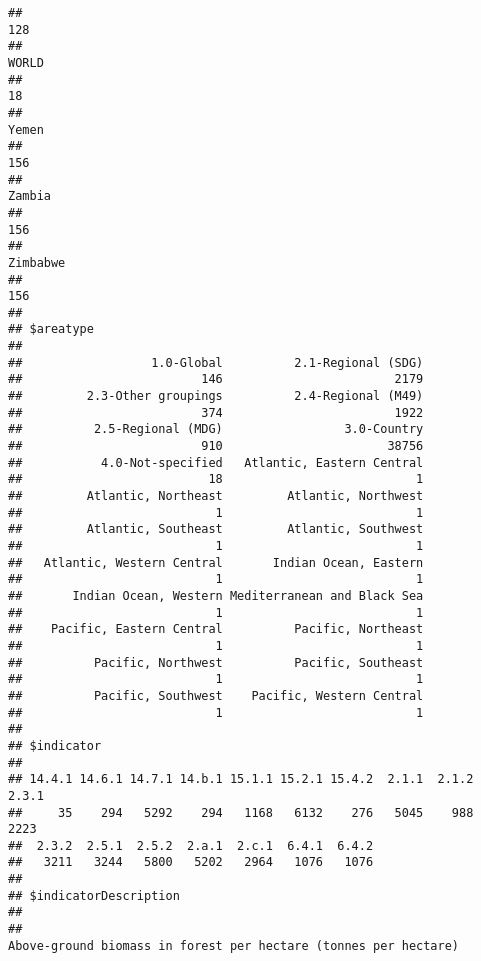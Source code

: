 \documentclass[]{article}
\begin{document}
\begin{verbatim}
##                                                                                          128 
##                                                                                        WORLD 
##                                                                                           18 
##                                                                                        Yemen 
##                                                                                          156 
##                                                                                       Zambia 
##                                                                                          156 
##                                                                                     Zimbabwe 
##                                                                                          156 
## 
## $areatype
## 
##                  1.0-Global          2.1-Regional (SDG) 
##                         146                        2179 
##         2.3-Other groupings          2.4-Regional (M49) 
##                         374                        1922 
##          2.5-Regional (MDG)                 3.0-Country 
##                         910                       38756 
##           4.0-Not-specified   Atlantic, Eastern Central 
##                          18                           1 
##         Atlantic, Northeast         Atlantic, Northwest 
##                           1                           1 
##         Atlantic, Southeast         Atlantic, Southwest 
##                           1                           1 
##   Atlantic, Western Central       Indian Ocean, Eastern 
##                           1                           1 
##       Indian Ocean, Western Mediterranean and Black Sea 
##                           1                           1 
##    Pacific, Eastern Central          Pacific, Northeast 
##                           1                           1 
##          Pacific, Northwest          Pacific, Southeast 
##                           1                           1 
##          Pacific, Southwest    Pacific, Western Central 
##                           1                           1 
## 
## $indicator
## 
## 14.4.1 14.6.1 14.7.1 14.b.1 15.1.1 15.2.1 15.4.2  2.1.1  2.1.2  2.3.1 
##     35    294   5292    294   1168   6132    276   5045    988   2223 
##  2.3.2  2.5.1  2.5.2  2.a.1  2.c.1  6.4.1  6.4.2 
##   3211   3244   5800   5202   2964   1076   1076 
## 
## $indicatorDescription
## 
##                                                                                     Above-ground biomass in forest per hectare (tonnes per hectare) 

\end{verbatim}
\end{document}

